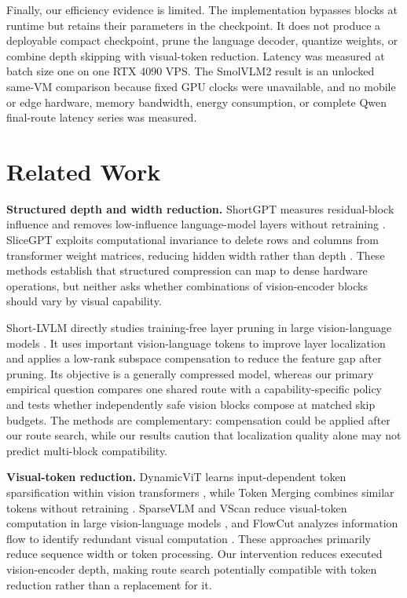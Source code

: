 \documentclass[10pt]{article}
\begin{document}
Finally, our efficiency evidence is limited. The implementation bypasses
blocks at runtime but retains their parameters in the checkpoint. It
does not produce a deployable compact checkpoint, prune the language
decoder, quantize weights, or combine depth skipping with visual-token
reduction. Latency was measured at batch size one on one RTX 4090 VPS.
The SmolVLM2 result is an unlocked same-VM comparison because fixed GPU
clocks were unavailable, and no mobile or edge hardware, memory
bandwidth, energy consumption, or complete Qwen final-route latency
series was measured.

\section{Related Work}\label{related-work}

\textbf{Structured depth and width reduction.} ShortGPT measures
residual-block influence and removes low-influence language-model layers
without retraining \citep{men2024shortgpt}. SliceGPT exploits
computational invariance to delete rows and columns from transformer
weight matrices, reducing hidden width rather than depth
\citep{ashkboos2024slicegpt}. These methods establish that structured
compression can map to dense hardware operations, but neither asks
whether combinations of vision-encoder blocks should vary by visual
capability.

Short-LVLM directly studies training-free layer pruning in large
vision-language models \citep{ma2025shortlvlm}. It uses important
vision-language tokens to improve layer localization and applies a
low-rank subspace compensation to reduce the feature gap after pruning.
Its objective is a generally compressed model, whereas our primary
empirical question compares one shared route with a capability-specific
policy and tests whether independently safe vision blocks compose at
matched skip budgets. The methods are complementary: compensation could
be applied after our route search, while our results caution that
localization quality alone may not predict multi-block compatibility.

\textbf{Visual-token reduction.} DynamicViT learns input-dependent token
sparsification within vision transformers \citep{rao2021dynamicvit},
while Token Merging combines similar tokens without retraining
\citep{bolya2023tome}. SparseVLM and VScan reduce visual-token
computation in large vision-language models
\citep{zhang2025sparsevlm, zhang2025vscan}, and FlowCut analyzes
information flow to identify redundant visual computation
\citep{tong2025flowcut}. These approaches primarily reduce sequence
width or token processing. Our intervention reduces executed
vision-encoder depth, making route search potentially compatible with
token reduction rather than a replacement for it.
\end{document}
